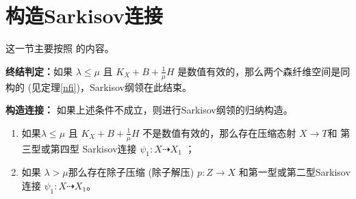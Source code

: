 \section{构造Sarkisov连接}
这一节主要按照 \cite[\S1]{brunoLogSarkisovProgram1995}的内容。

\textbf{终结判定：}如果 $ \lambda\leqslant\mu $ 且 $ K_X+B+\frac{1}{\mu}H $ 是数值有效的，那么两个森纤维空间是同构的 (见定理\ref{nfi})，Sarkisov纲领在此结束。

\textbf{构造连接：}
如果上述条件不成立，则进行Sarkisov纲领的归纳构造。
\begin{lemma}
  \begin{enumerate}
    \item 如果$ \lambda\leqslant\mu $ 且 $ K_X+B+\frac{1}{\mu}H $ 不是数值有效的，那么存在压缩态射 $X \to T$和 第三型或第四型 Sarkisov连接 $\psi_{1}:X\dashrightarrow X_{1}$ ；
    \item  如果 $ \lambda>\mu $那么存在除子压缩 (除子解压) $p:Z\to X$ 和第一型或第二型Sarkisov 连接 $ \psi_{1}:X\dashrightarrow X_{1}$。
  \end{enumerate}
\end{lemma}
